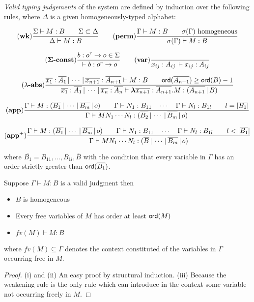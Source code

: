 \emph{Valid typing judgements} of the
system are defined by induction over the following rules, where
$\Delta$ is a given homogeneously-typed alphabet:

$$ \mathbf{(wk)}
    {   \frac{\displaystyle  {{\Sigma} \vdash {M:B}} \qquad {\Sigma \subset \Delta} }{ {{\Delta } \vdash {M : B}}}
   }
\qquad
    \mathbf{(perm)}
    {
      \frac{\displaystyle  {{\Gamma} \vdash {M:B}} \qquad \sigma(\Gamma) \hbox{ homogeneous} }{ {{\sigma(\Gamma)} \vdash {M : B}} }
    }
$$


$$ \mathbf{(\Sigma\mbox{\textbf{-const}})}  \frac{\displaystyle b : o^r \rightarrow o \in \Sigma}{{{} \vdash {b : o^r \rightarrow o}}}
\qquad
 \mathbf{(var)} \frac{\displaystyle }{{{x_{ij} : A_{ij}\, } \vdash {x_{ij} : A_{ij}}}}
$$

$$ \mathbf{(\lambda\mbox{\textbf{-abs}})}
\frac{\displaystyle  {{{\overline{x_1} : \overline{A_1}\, | \, \cdots\, | \,
\overline{x_{n+1}} : \overline{A_{n+1}}} \vdash {M : B}}} \qquad
{\sf ord}(\overline{A_{n+1}}) \geq {\sf ord}(B) -1}{{{\overline{x_1} :
\overline{A_1}\, | \, \cdots\, | \, \overline{x_{n}} :
\overline{A_{n}}} \vdash {{\hbox{\boldmath $\lambda$}{\overline{x_{n+1}} : \overline{A_{n+1}}}.{M}}
: (\overline{A_{n+1}} \, | \, B)}}} $$

$$ \mathbf{(app)} \frac{\displaystyle {{{\Gamma} \vdash {M : (\overline{B_1} \, | \, \cdots \, | \, \overline{B_m} \, | \, o)}} \qquad
{{\Gamma} \vdash {N_1 : B_{11}}} \quad \cdots \quad {{\Gamma} \vdash {N_{l} :
B_{1l}}} \qquad l = |\overline{B_1}| }}{ {{\Gamma} \vdash {M N_1
\cdots N_{l} : (\overline{B_2} \, | \, \cdots \, | \,
\overline{B_m} \, | \, o)}}} $$


$$ \mathbf{(app^+)} \frac{\displaystyle {{\Gamma} \vdash {M : (\overline{B_1} \, | \, \cdots \, | \, \overline{B_m} \, | \, o)}} \qquad
    {{\Gamma} \vdash {N_1 : B_{11}}} \quad \cdots \quad {{\Gamma} \vdash {N_{l} :
    B_{1l}}} \qquad l < |\overline{B_1}| }{ {{\Gamma} \vdash {M N_1
    \cdots N_{l} : (\overline{B} \, | \, \cdots \, | \,
    \overline{B_m} \, | \, o)}}} $$

where $\overline{B_1} = B_{11}, \ldots, B_{1l},\overline{B}$ with
the condition that every variable in $\Gamma$ has an order strictly greater
than ${\sf ord}(\overline{B_1})$.


\begin{property}
\label{proper:safe_basic_prop} Suppose $\Gamma \vdash M : B$ is a
valid judgment then
\begin{itemize}
\item[(i)] $B$ is homogeneous
\item[(ii)] Every free variables of $M$ has order at least ${\sf ord}(M)$
\item[(iii)] $fv(M) \vdash M : B$
\end{itemize}
where $fv(M) \subseteq \Gamma$ denotes the context constituted of the variables
in $\Gamma$ occurring free in $M$.
\end{property}
\begin{proof}
(i) and (ii) An easy proof by structural induction.
(iii) Because the weakening rule is the only rule which can introduce in the context some variable not occurring freely in $M$.
\end{proof}

